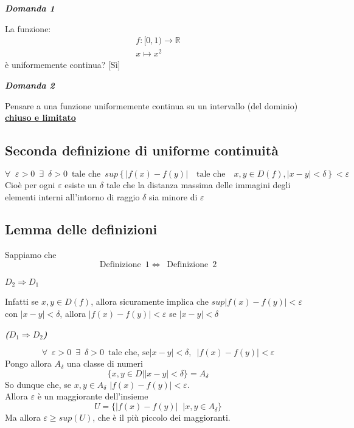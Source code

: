 \documentclass{article}
\theoremstyle{definition}
\begin{document}
\begin{center}
    \textbf{\textit{Domanda 1}}
\end{center}
La funzione:
\begin{align*}
    f: [0,1) \to \mathbb{R} \\
    x \mapsto x^2
\end{align*}
è uniformemente continua? [Sì]
\begin{center}
    \textbf{\textit{Domanda 2}}
\end{center}
Pensare a una funzione uniformemente continua su un intervallo (del dominio) \underline{\textbf{chiuso e limitato}}
\subsection{Seconda definizione di uniforme continuità}
\begin{equation}
    \forall \,\,\ \varepsilon>0 \,\,\,\exists \,\,\, \delta>0 \,\,\, \mbox{tale che} \,\,\, sup\left\{\left|f(x)-f(y)\right|\,\,\,\,\,\, \mbox{tale che}\,\,\,\,\,\, x,y \in D(f) , |x-y|<\delta \right\} <\varepsilon
\end{equation}
Cioè per ogni $\varepsilon$ esiste un $\delta$ tale che la distanza massima delle immagini degli elementi interni all'intorno di raggio $\delta$ sia minore di $\varepsilon$


\newpage
\subsection{Lemma delle definizioni}
Sappiamo che
\begin{equation}
    \mbox{Definizione} \,\,\,1 \Longleftrightarrow \,\,\, \mbox{Definizione} \,\,\, 2
\end{equation}
\begin{center}
    \textbf{\textit{$D_2\Longrightarrow D_1$}}
\end{center}
Infatti se $x,y \in D(f)$, allora sicuramente implica che $sup|f(x)-f(y)|<\varepsilon$ con $|x-y|<\delta$, allora $|f(x)-f(y)|<\varepsilon$ se $|x-y|<\delta$
\begin{center}
    \textbf{\textit{($D_1 \Longrightarrow D_2$)}}
\end{center}
\begin{equation}
    \forall \,\,\, \varepsilon>0 \,\,\, \exists \,\,\, \delta>0 \,\,\, \mbox{tale che, se} |x-y|<\delta, \,\,\, |f(x)-f(y)|<\varepsilon
\end{equation}
Pongo allora $A_{\delta}$ una classe di numeri
\begin{equation*}
    \{x,y \in D \big| |x-y|<\delta\}=A_\delta
\end{equation*}
So dunque che, se $x,y \in A_{\delta}$ $|f(x)-f(y)|<\varepsilon$.
\\
Allora $\varepsilon$ è un maggiorante dell'insieme
\begin{equation*}
    U=\{|f(x)-f(y)| \,\,\ | x,y \in A_\delta\}
\end{equation*}
Ma allora $\varepsilon \geqslant sup(U)$, che è il più piccolo dei maggioranti.
\end{document}
